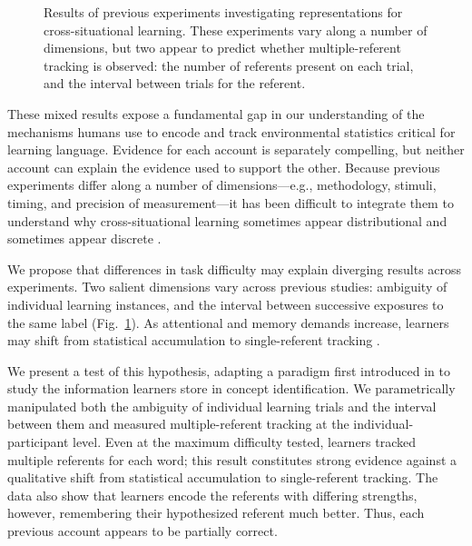 \documentclass[man,floatsintext]{apa6}
\begin{document}
 \begin{figure}[tb]
	\caption{\label{fig:mrefs} Results of previous experiments investigating representations for cross-situational learning. These experiments vary along a number of dimensions, but two appear to predict whether multiple-referent tracking is observed: the number of referents present on each trial, and the interval between trials for the referent.}
\end{figure}

These mixed results expose a fundamental gap in our understanding of the mechanisms humans use to encode and track environmental statistics critical for learning language. Evidence for each account is separately compelling, but neither account can explain the evidence used to support the other. Because previous experiments differ along a number of dimensions---e.g., methodology, stimuli, timing, and precision of measurement---it has been difficult to integrate them to understand why cross-situational learning sometimes appear distributional and sometimes appear discrete \cite<for a review, see>{Yurovsky2014}. 

We propose that differences in task difficulty may explain diverging results across experiments. Two salient dimensions vary across previous studies: ambiguity of individual learning instances, and the interval between successive exposures to the same label (Fig.~\ref{fig:mrefs}). As attentional and memory demands increase, learners may shift from statistical accumulation to single-referent tracking \cite{Smith2011a, Trueswell2013}. 

We present a test of this hypothesis, adapting a paradigm first introduced in  to study the information learners store in concept identification. We parametrically manipulated both the ambiguity of individual learning trials and the interval between them and measured multiple-referent tracking at the individual-participant level. Even at the maximum difficulty tested, learners tracked multiple referents for each word; this result constitutes strong evidence against a qualitative shift from statistical accumulation to single-referent tracking. The data also show that learners encode the referents with differing strengths, however, remembering their hypothesized referent much better. Thus, each previous account appears to be partially correct. 
\end{document}

